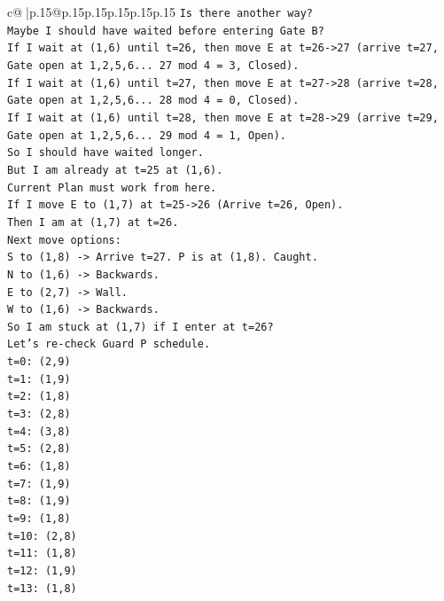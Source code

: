 \documentclass{article}
\begin{document}
{\begin{supertabular}{c@{$\;$}|p{.15\linewidth}@{}p{.15\linewidth}p{.15\linewidth}p{.15\linewidth}p{.15\linewidth}p{.15\linewidth}}
{{{\texttt{Is there another way?} \\
\texttt{Maybe I should have waited before entering Gate B?} \\
\texttt{If I wait at (1,6) until t=26, then move E at t=26{-}>27 (arrive t=27, Gate open at 1,2,5,6... 27 mod 4 = 3, Closed).} \\
\texttt{If I wait at (1,6) until t=27, then move E at t=27{-}>28 (arrive t=28, Gate open at 1,2,5,6... 28 mod 4 = 0, Closed).} \\
\texttt{If I wait at (1,6) until t=28, then move E at t=28{-}>29 (arrive t=29, Gate open at 1,2,5,6... 29 mod 4 = 1, Open).} \\
\texttt{So I should have waited longer.} \\
\texttt{But I am already at t=25 at (1,6).} \\
\texttt{Current Plan must work from here.} \\
\texttt{If I move E to (1,7) at t=25{-}>26 (Arrive t=26, Open).} \\
\texttt{Then I am at (1,7) at t=26.} \\
\texttt{Next move options:} \\
\texttt{S to (1,8) {-}> Arrive t=27. P is at (1,8). Caught.} \\
\texttt{N to (1,6) {-}> Backwards.} \\
\texttt{E to (2,7) {-}> Wall.} \\
\texttt{W to (1,6) {-}> Backwards.} \\
\texttt{So I am stuck at (1,7) if I enter at t=26?} \\
\texttt{Let's re{-}check Guard P schedule.} \\
\texttt{t=0: (2,9)} \\
\texttt{t=1: (1,9)} \\
\texttt{t=2: (1,8)} \\
\texttt{t=3: (2,8)} \\
\texttt{t=4: (3,8)} \\
\texttt{t=5: (2,8)} \\
\texttt{t=6: (1,8)} \\
\texttt{t=7: (1,9)} \\
\texttt{t=8: (1,9)} \\
\texttt{t=9: (1,8)} \\
\texttt{t=10: (2,8)} \\
\texttt{t=11: (1,8)} \\
\texttt{t=12: (1,9)} \\
\texttt{t=13: (1,8)} \\
}}}
\end{supertabular}}
\end{document}
